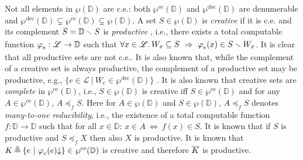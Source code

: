 \documentclass[runningheads]{llncs}
\def\ok#1{\mbox{\raisebox{0ex}[1ex][1ex]{$#1$}}}
\def\re{c.e.}
\def\wpre{\wp^{\text{ce}}}
\def\wprec{\wp^{\text{dec}}}
\newcommand{\ccL}{\mathscr{L}}
\newcommand{\ccD}{\mathscr{D}}
\newcommand{\Domain}{\mathbb{D}}
\newcommand{\pfunction}[3]{\ok{\varphi^{#2\, #3}_{#1}}}
\newcommand{\compl}[1]{\ok{\overline{#1}}}
\newcommand{\ra}{\rightarrow}
\newcommand{\ud}{\ok{\:\triangleq\:}}
\def\ok#1{\mbox{\raisebox{0ex}[1ex][1ex]{$#1$}}}
\newcommand{\sset}[2]{\{#1  ~|~ #2\}}
\newcommand{\nat}{\omega}
\begin{document}
\smallskip

Not all elements in $\wp(\Domain)$ are \re: 
both $\wpre(\Domain)$ and $\wprec(\Domain)$ are denumerable and $\wprec(\Domain)\subsetneq\wpre(\Domain)\subsetneq\wp(\Domain)$.
A set $S\in\wp(\Domain)$ is {\em creative\/} if it is {\re} and its complement $\compl{S}=\Domain\smallsetminus S$ is {\em productive\/} \cite{Post44,Myhill55}, i.e., there exists a total computable function $\pfunction{e}{}{}:\ccL\ra\Domain$ such that
$\forall x\in\ccL. \, W_x\subseteq \compl{S}~\Rightarrow~\pfunction{e}{}{}(x)\in\compl{S}\smallsetminus W_x$.
It is clear that all productive sets are not {\re}. It is also known that, while the complement of a creative set is always productive, the complement of a productive set may be productive, e.g., $\sset{e\in \ccL}{\mbox{$W_e\in\wprec(\Domain)$}}$ \cite{Dekker55}. It is also known that creative sets are {\em complete\/} in $\wpre(\Domain)$, i.e., $S\in \wp(\Domain)$ is creative iff $S\in\wpre(\Domain)$ and
for any $A\in\wpre(\Domain)$, $A\preceq_f S$. Here for $A\in \wp(\Domain)$ and $S\in \wp(\Domain)$, $A\preceq_f S$ denotes {\em many-to-one reducibility}, i.e., the existence of a total computable function $f:\Domain \ra \Domain$ such that for all $x\in \Domain$: $x\in A~\Leftrightarrow~f(x)\in S$. It is known that if $S$ is productive and $S\preceq_f X$ then also $X$ is productive. It is known that $\ok{K\ud\sset{e}{\pfunction{e}{}{}(e){\downarrow}}\in\wpre(\Domain)}$ is creative and therefore
$\ok{\compl{K}}$ is productive.

\smallskip
\end{document}
